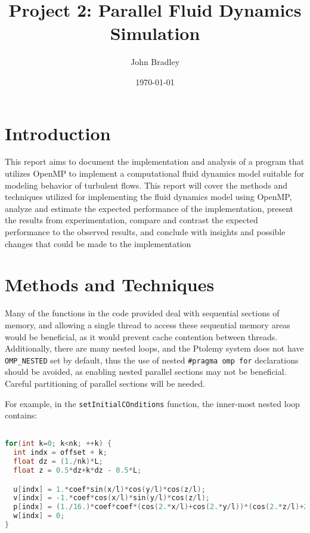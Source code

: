 \documentclass{article}
\title{Project 2: Parallel Fluid Dynamics Simulation}
\author{John Bradley}
\date{\today}
\begin{document}
  \maketitle

  \section{Introduction}

  This report aims to document the implementation and analysis of a program
  that utilizes OpenMP to implement a computational fluid dynamics model
  suitable for modeling behavior of turbulent flows. This report will cover the
  methods and techniques utilized for implementing the fluid dynamics model
  using OpenMP, analyze and estimate the expected performance of the 
  implementation, present the results from experimentation, compare and contrast 
  the expected performance to the observed results, and conclude with insights 
  and possible changes that could be made to the implementation
  
  \section{Methods and Techniques}

  Many of the functions in the code provided deal with sequential
  sections of memory, and allowing a single thread to access these sequential
  memory areas would be beneficial, as it would prevent cache contention
  between threads. Additionally, there are many nested loops, and the Ptolemy 
  system does not have \verb|OMP_NESTED| set by default, thus the use of nested
  \verb|#pragma omp for| declarations should be avoided, as enabling nested
  parallel sections may not be beneficial. Careful partitioning of parallel 
  sections will be needed.

  For example, in the \verb|setInitialCOnditions| function, the inner-most
  nested loop contains:

  \begin{lstfloat}
  \begin{lstlisting}[language=C, 
                     linewidth=1\textwidth,
                     breaklines=true, 
                     basicstyle=\small\ttfamily]

for(int k=0; k<nk; ++k) {
  int indx = offset + k;
  float dz = (1./nk)*L;
  float z = 0.5*dz+k*dz - 0.5*L;

  u[indx] = 1.*coef*sin(x/l)*cos(y/l)*cos(z/l);
  v[indx] = -1.*coef*cos(x/l)*sin(y/l)*cos(z/l);
  p[indx] = (1./16.)*coef*coef*(cos(2.*x/l)+cos(2.*y/l))*(cos(2.*z/l)+2.);
  w[indx] = 0;
}
  \end{lstlisting}
  \end{lstfloat}
\end{document}
